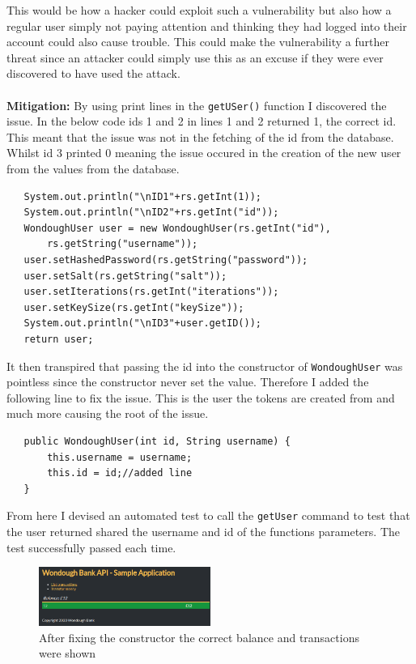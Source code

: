 This would be how a hacker could exploit such a vulnerability but also how a regular user simply not paying attention and thinking they had logged into their account could also
cause trouble. This could make the vulnerability a further threat since an attacker could simply use this as an excuse if they were ever discovered to have used the attack.\\ \\
\textbf{Mitigation:} By using print lines in the \verb|getUSer()| function I discovered the issue. In the below code ids 1 and 2 in lines 1 and 2 returned 1, the correct id. This
meant that the issue was not in the fetching of the id from the database. Whilst id 3 printed 0 meaning the issue occured in the creation of the new user from the values from
the database.
\begin{verbatim}
   System.out.println("\nID1"+rs.getInt(1));
   System.out.println("\nID2"+rs.getInt("id"));
   WondoughUser user = new WondoughUser(rs.getInt("id"),
       rs.getString("username"));
   user.setHashedPassword(rs.getString("password"));
   user.setSalt(rs.getString("salt"));
   user.setIterations(rs.getInt("iterations"));
   user.setKeySize(rs.getInt("keySize"));
   System.out.println("\nID3"+user.getID());
   return user;
\end{verbatim}
It then transpired that passing the id into the constructor of \verb|WondoughUser| was pointless since the constructor never set the value. Therefore I added the following line
to fix the issue. This is the user the tokens are created from and much more causing the root of the issue.
\begin{verbatim}
   public WondoughUser(int id, String username) {
       this.username = username;
       this.id = id;//added line
   }
\end{verbatim}
From here I devised an automated test to call the \verb|getUser| command to test that the user returned shared the username and id of the functions parameters. The test successfully passed each time.
\begin{figure}[h]
    \centering
    \includegraphics[width=0.5\textwidth]{figs/hackerbalance.png}
    \caption{After fixing the constructor the correct balance and transactions were shown}
    \label{figvun6}
  \end{figure}
